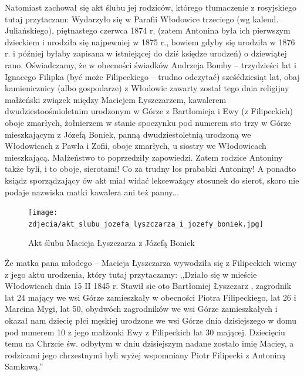 Natomiast zachował się akt ślubu jej rodziców, którego tłumaczenie z rosyjskiego tutaj przytaczam: Wydarzyło się w Parafii Włodowice trzeciego (wg kalend. Juliańskiego), piętnastego czerwca 1874 r. (zatem Antonina była ich pierwszym dzieckiem i urodziła się najpewniej w 1875 r., bowiem gdyby się urodziła w 1876 r. i później byłaby zapisana w istniejącej do dziś księdze urodzeń) o dziewiątej rano. Oświadczamy, że w obecności świadków Andrzeja Bomby -- trzydzieści lat i Ignacego Filipka (być może Filipeckiego -- trudno odczytać) sześćdziesiąt lat, obaj kamienicznicy (albo gospodarze) z Włodowic zawarty został tego dnia religijny małżeński związek między Maciejem Łyszczarzem, kawalerem dwudziestoośmioletnim urodzonym w Górze z Bartłomieja i Ewy (z Filipeckich) oboje zmarłych, żołnierzem w stanie spoczynku pod numerem sto trzy w Górze mieszkającym z Józefą Boniek, panną dwudziestoletnią urodzoną we Włodowicach z Pawła i Zofii, oboje zmarłych, u siostry we Włodowicach mieszkającą. Małżeństwo to poprzedziły zapowiedzi. Zatem rodzice Antoniny także byli, i to oboje, sierotami! Co za trudny los prababki Antoniny! A ponadto ksiądz sporządzający ów akt miał widać lekceważący stosunek do sierot, skoro nie podaje nazwiska matki kawalera ani też panny...

\begin{figure}[!h]
\begin{center}
\texttt{[image: zdjecia/akt\_slubu\_jozefa\_lyszczarza\_i\_jozefy\_boniek.jpg]}
\caption[Akt ślubu Macieja Łyszczarza z Józefą Boniek]{Akt ślubu Macieja Łyszczarza z Józefą Boniek}
\label{rys:akt_slubu_jozefa_lyszczarza_i_jozefy_boniek}
\end{center}
\end{figure}

Że matka pana młodego -- Macieja Łyszczarza wywodziła się z Filipeckich wiemy z jego aktu urodzenia, który tutaj przytaczamy: ,,Działo się w mieście Włodowicach dnia 15 II 1845 r. Stawił sie oto Bartłomiej Łyszczarz , zagrodnik lat 24 mający we wsi Górze zamieszkały w obecności Piotra Filipeckiego, lat 26 i Marcina Mygi, lat 50, obydwóch zagrodników we wsi Górze zamieszkałych i okazał nam dziecię płci męskiej urodzone we wsi Górze dnia dzisiejszego w domu pod numerem 10 z jego małżonki Ewy z Filipeckich lat 30 mającej. Dziecięciu temu na Chrzcie św. odbytym w dniu dzisiejszym nadane zostało imię Maciey, a rodzicami jego chrzestnymi byli wyżej wspomniany Piotr Filipecki z Antoniną Samkową.''


